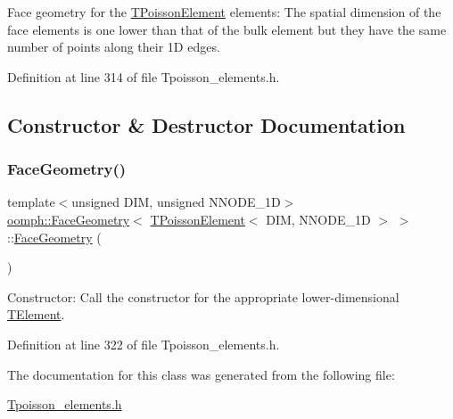 Face geometry for the \hyperlink{classoomph_1_1TPoissonElement}{T\+Poisson\+Element} elements\+: The spatial dimension of the face elements is one lower than that of the bulk element but they have the same number of points along their 1D edges. 

Definition at line 314 of file Tpoisson\+\_\+elements.\+h.



\subsection{Constructor \& Destructor Documentation}
\mbox{\label{classoomph_1_1FaceGeometry_3_01TPoissonElement_3_01DIM_00_01NNODE__1D_01_4_01_4_a813c5c6300f9b2286e3b05219f513be2}} 
\subsubsection{\texorpdfstring{Face\+Geometry()}{FaceGeometry()}}
{\footnotesize\ttfamily template$<$unsigned D\+IM, unsigned N\+N\+O\+D\+E\+\_\+1D$>$ \\
\hyperlink{classoomph_1_1FaceGeometry}{oomph\+::\+Face\+Geometry}$<$ \hyperlink{classoomph_1_1TPoissonElement}{T\+Poisson\+Element}$<$ D\+IM, N\+N\+O\+D\+E\+\_\+1D $>$ $>$\+::\hyperlink{classoomph_1_1FaceGeometry}{Face\+Geometry} (\begin{DoxyParamCaption}{ }\end{DoxyParamCaption})\hspace{0.3cm}{\ttfamily [inline]}}



Constructor\+: Call the constructor for the appropriate lower-\/dimensional \hyperlink{classoomph_1_1TElement}{T\+Element}. 



Definition at line 322 of file Tpoisson\+\_\+elements.\+h.



The documentation for this class was generated from the following file\+:\begin{DoxyCompactItemize}
\item 
\hyperlink{Tpoisson__elements_8h}{Tpoisson\+\_\+elements.\+h}\end{DoxyCompactItemize}
